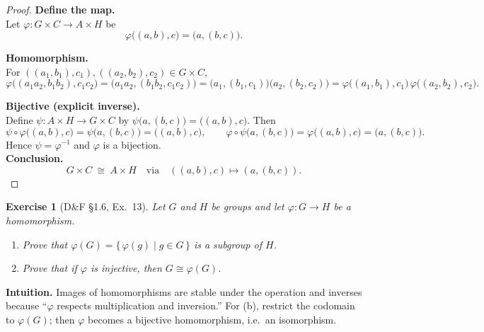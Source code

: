 \documentclass[12pt]{article}
\newtheorem{exercise}[theorem]{Exercise}
\theoremstyle{definition}
\begin{document}
\begin{proof}
\noindent\textbf{Define the map.}\\
\noindent Let $\varphi:G\times C\to A\times H$ be
\[
\varphi\big((a,b),c\big)=\big(a,(b,c)\big).
\]

\noindent\textbf{Homomorphism.}\\
\noindent For $((a_1,b_1),c_1),((a_2,b_2),c_2)\in G\times C$,
\[
\varphi\big((a_1a_2,b_1b_2),c_1c_2\big)
=\big(a_1a_2,(b_1b_2,c_1c_2)\big)
=\big(a_1,(b_1,c_1)\big)\big(a_2,(b_2,c_2)\big)
=\varphi\big((a_1,b_1),c_1\big)\,\varphi\big((a_2,b_2),c_2\big).
\]

\noindent\textbf{Bijective (explicit inverse).}\\
\noindent Define $\psi:A\times H\to G\times C$ by $\psi\big(a,(b,c)\big)=\big((a,b),c\big)$. Then
\[
\psi\circ\varphi\big((a,b),c\big)=\psi\big(a,(b,c)\big)=\big((a,b),c\big),\qquad
\varphi\circ\psi\big(a,(b,c)\big)=\varphi\big((a,b),c\big)=\big(a,(b,c)\big).
\]
Hence $\psi=\varphi^{-1}$ and $\varphi$ is a bijection.\\

\noindent\textbf{Conclusion.}\\
\[
\boxed{\,G\times C\ \cong\ A\times H\quad\text{via}\quad((a,b),c)\longmapsto (a,(b,c)).\,}
\]
\end{proof}

\newpage

\begin{exercise}[D\&F §1.6, Ex.~13]
Let $G$ and $H$ be groups and let $\varphi:G\to H$ be a homomorphism.
\begin{enumerate}
\item[(a)] Prove that $\varphi(G)=\{\,\varphi(g)\mid g\in G\,\}$ is a subgroup of $H$.
\item[(b)] Prove that if $\varphi$ is injective, then $G\cong \varphi(G)$.
\end{enumerate}
\end{exercise}

\dotfill

\noindent\textbf{Intuition.}
Images of homomorphisms are stable under the operation and inverses because “$\varphi$ respects multiplication and inversion.” For (b), restrict the codomain to $\varphi(G)$; then $\varphi$ becomes a bijective homomorphism, i.e.\ an isomorphism.\\

\dotfill
\end{document}
